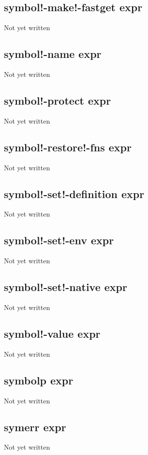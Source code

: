 \documentclass[a4paper,11pt]{article}
\begin{document}
\subsection{\ttfamily symbol!-make!-fastget expr}
Not yet written

\subsection{\ttfamily symbol!-name expr}
Not yet written

\subsection{\ttfamily symbol!-protect expr}
Not yet written

\subsection{\ttfamily symbol!-restore!-fns expr}
Not yet written

\subsection{\ttfamily symbol!-set!-definition expr}
Not yet written

\subsection{\ttfamily symbol!-set!-env expr}
Not yet written

\subsection{\ttfamily symbol!-set!-native expr}
Not yet written

\subsection{\ttfamily symbol!-value expr}
Not yet written

\subsection{\ttfamily symbolp expr}
Not yet written

\subsection{\ttfamily symerr expr}
Not yet written
\end{document}
